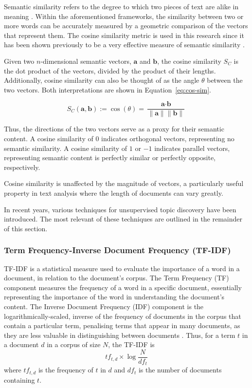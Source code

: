 \documentclass[twocolumn]{article}
\begin{document}
Semantic similarity refers to the degree to which two pieces of text are alike in meaning \cite{mohammad2012}. Within the aforementioned frameworks, the similarity between two or more words can be accurately measured by a geometric comparison of the vectors that represent them. The cosine similarity metric is used in this research since it has been shown previously to be a very effective measure of semantic similarity \cite{bullinaria2007}.

Given two $n$-dimensional semantic vectors, $\textbf{a}$ and $\textbf{b}$, the cosine similarity $S_C$ is the dot product of the vectors, divided by the product of their lengths. Additionally, cosine similarity can also be thought of as the angle $\theta$ between the two vectors. Both interpretations are shown in Equation~\ref{eq:cos-sim}.

\begin{equation}\label{eq:cos-sim}    
S_C(\textbf{a}, \textbf{b}) := \cos(\theta) = \frac{\textbf{a} \cdot \textbf{b}}{\|\textbf{a}\| \|\textbf{b}\|}
\end{equation}

Thus, the directions of the two vectors serve as a proxy for their semantic content. A cosine similarity of $0$ indicates orthogonal vectors, representing no semantic similarity. A cosine similarity of $1$ or $-1$ indicates parallel vectors, representing semantic content is perfectly similar or perfectly opposite, respectively.

Cosine similarity is unaffected by the magnitude of vectors, a particularly useful property in text analysis where the length of documents can vary greatly.

In recent years, various techniques for unsupervised topic discovery have been introduced. The most relevant of these techniques are outlined in the remainder of this section.

\subsubsection{Term Frequency-Inverse Document Frequency (TF-IDF)}

TF-IDF is a statistical measure used to evaluate the importance of a word in a document, in relation to the document’s corpus.
The Term Frequency (TF) component measures the frequency of a word in a specific document, essentially representing the importance of the word in understanding the document's content.
The Inverse Document Frequency (IDF) component is the logarithmically-scaled, inverse of the frequency of documents in the corpus that contain a particular term, penalising terms that appear in many documents, as they are less valuable in distinguishing between documents \cite{sparckjones1972}. Thus, for a term $t$ in a document $d$ in a corpus of size $N$, the TF-IDF is
\begin{equation}
    {t\!f}_{t,d} \times \log\frac{N}{{df}_t}
\end{equation}
where ${t\!f}_{t,d}$ is the frequency of $t$ in $d$ and ${df}_t$ is the number of documents containing $t$.
\end{document}
